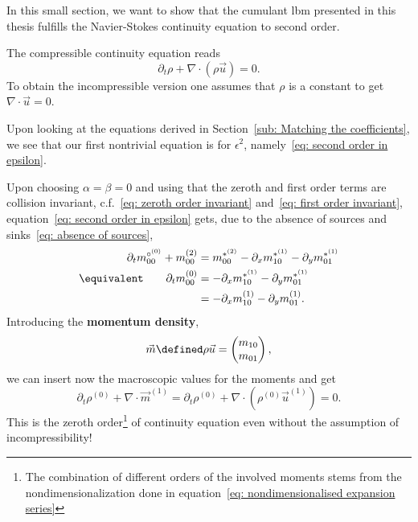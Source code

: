 In this small section, we want to show that the cumulant \gls{lbm} presented in this thesis fulfills the Navier-Stokes continuity equation to second order.

The compressible continuity equation reads
\begin{equation}
  \label{eq: continuity equation}
  \partial_t \rho + \nabla \cdot (\rho \vec{u}) = 0.
\end{equation}
To obtain the incompressible version one assumes that $\rho$ is a constant to get $\nabla\cdot\vec{u}=0$.

Upon looking at the equations derived in Section~\ref{sub: Matching the coefficients}, we see that our first nontrivial equation is for $\epsilon^2$, namely~\eqref{eq: second order in epsilon}.

Upon choosing $\alpha=\beta=0$ and using that the zeroth and first order terms are collision invariant, c.f.~\eqref{eq: zeroth order invariant} and~\eqref{eq: first order invariant}, equation~\eqref{eq: second order in epsilon} gets, due to the absence of sources and sinks~\eqref{eq: absence of sources},
\begin{align}
  \nonumber
  \partial_t m_{00}^{\circ^{(0)}} + m_{00}^{(2)} & =  m_{00}^{*^{(2)}} - \partial_x m_{10}^{*^{(1)}} - \partial_y m_{01}^{*^{(1)}}
   \\\equivalent \qquad
   \partial_t m_{00}^{(0)} & =  - \partial_x m_{10}^{*^{(1)}} - \partial_y m_{01}^{*^{(1)}} \nonumber
   \\
    & =  - \partial_x m_{10}^{(1)} - \partial_y m_{01}^{(1)}.
  \label{eq: continuity moments}
\end{align}
Introducing the \textbf{momentum density},
\begin{equation}
  \vec{m} \defined \rho \vec{u} = \begin{pmatrix}m_{10} \\m_{01}  \end{pmatrix},
\end{equation}
we can insert now the macroscopic values for the moments and get
\begin{equation}
  \partial_t \rho^{(0)} + \nabla \cdot \vec{m}^{(1)} =
  \partial_t \rho^{(0)} + \nabla \cdot (\rho^{(0)} \vec{u}^{(1)}) = 0.
\end{equation}
This is the zeroth order\footnote{The combination of different orders of the involved moments stems from the nondimensionalization done in equation~\eqref{eq: nondimensionalised expansion series}} of continuity equation even without the assumption of incompressibility!


